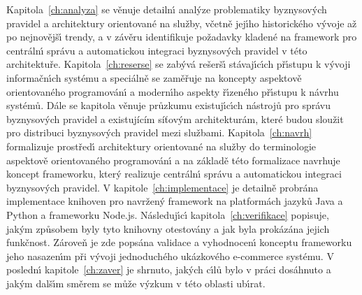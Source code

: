Kapitola~\ref{ch:analyza} se věnuje detailn\'{\i} anal\'yze problematiky byznysov\'ych pravidel a
architektury orientované na služby, včetně jej\'{\i}ho historického v\'yvoje až po nejnovějš\'{\i} trendy,
a v závěru identifikuje požadavky kladené na framework pro centráln\'{\i} správu a
automatickou integraci byznysov\'ych pravidel v této architektuře. Kapitola~\ref{ch:reserse}
se zab\'yvá rešerš\'{\i} stávaj\'{\i}c\'{\i}ch př\'{\i}stupu k v\'yvoji informačn\'{\i}ch systému a speciálně se zaměřuje
na koncepty aspektově orientovaného programován\'{\i} a modern\'{\i}ho aspekty ř\'{\i}zeného př\'{\i}stupu k návrhu
systémů. Dále se kapitola věnuje průzkumu existuj\'{\i}c\'{\i}ch nástrojů pro správu byznysov\'ych pravidel a existujícím
síťovým architekturám, které budou sloužit pro distribuci byznysových pravidel mezi službami.
Kapitola~\ref{ch:navrh} formalizuje prostřed\'{\i} architektury orientované na služby do terminologie
aspektově orientovaného programován\'{\i} a na základě této formalizace navrhuje koncept frameworku,
kter\'y realizuje centráln\'{\i} správu a automatickou integraci byznysov\'ych pravidel.
V kapitole~\ref{ch:implementace} je detailně probrána implementace knihoven pro navržen\'y framework
na platformách jazyků Java a Python a frameworku Node.js. Následuj\'{\i}c\'{\i} kapitola~\ref{ch:verifikace}
popisuje, jak\'ym způsobem byly tyto knihovny otestovány a jak byla prokázána jejich funkčnost. Zároveň
je zde popsána validace a vyhodnocen\'{\i} konceptu frameworku jeho nasazen\'{\i}m při v\'yvoji
jednoduchého ukázkového e-commerce systému. V posledn\'{\i} kapitole~\ref{ch:zaver} je shrnuto, jak\'ych
c\'{\i}lů bylo v práci dosáhnuto a jak\'ym dalš\'{\i}m směrem se může v\'yzkum v této oblasti ub\'{\i}rat.
